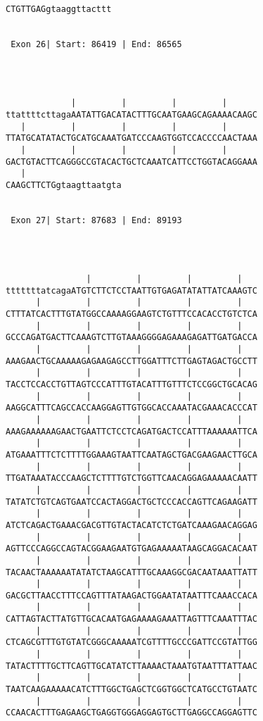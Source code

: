 \documentclass{article}
\begin{document}
\begin{Verbatim}
CTGTTGAGgtaaggttacttt


 Exon 26| Start: 86419 | End: 86565 




             |         |         |         |      
ttattttcttagaAATATTGACATACTTTGCAATGAAGCAGAAAACAAGC
   |         |         |         |         |      
TTATGCATATACTGCATGCAAATGATCCCAAGTGGTCCACCCCAACTAAA
   |         |         |         |         |      
GACTGTACTTCAGGGCCGTACACTGCTCAAATCATTCCTGGTACAGGAAA
   |      
CAAGCTTCTGgtaagttaatgta


 Exon 27| Start: 87683 | End: 89193 




                |         |         |         |   
tttttttatcagaATGTCTTCTCCTAATTGTGAGATATATTATCAAAGTC
      |         |         |         |         |   
CTTTATCACTTTGTATGGCCAAAAGGAAGTCTGTTTCCACACCTGTCTCA
      |         |         |         |         |   
GCCCAGATGACTTCAAAGTCTTGTAAAGGGGAGAAAGAGATTGATGACCA
      |         |         |         |         |   
AAAGAACTGCAAAAAGAGAAGAGCCTTGGATTTCTTGAGTAGACTGCCTT
      |         |         |         |         |   
TACCTCCACCTGTTAGTCCCATTTGTACATTTGTTTCTCCGGCTGCACAG
      |         |         |         |         |   
AAGGCATTTCAGCCACCAAGGAGTTGTGGCACCAAATACGAAACACCCAT
      |         |         |         |         |   
AAAGAAAAAAGAACTGAATTCTCCTCAGATGACTCCATTTAAAAAATTCA
      |         |         |         |         |   
ATGAAATTTCTCTTTTGGAAAGTAATTCAATAGCTGACGAAGAACTTGCA
      |         |         |         |         |   
TTGATAAATACCCAAGCTCTTTTGTCTGGTTCAACAGGAGAAAAACAATT
      |         |         |         |         |   
TATATCTGTCAGTGAATCCACTAGGACTGCTCCCACCAGTTCAGAAGATT
      |         |         |         |         |   
ATCTCAGACTGAAACGACGTTGTACTACATCTCTGATCAAAGAACAGGAG
      |         |         |         |         |   
AGTTCCCAGGCCAGTACGGAAGAATGTGAGAAAAATAAGCAGGACACAAT
      |         |         |         |         |   
TACAACTAAAAAATATATCTAAGCATTTGCAAAGGCGACAATAAATTATT
      |         |         |         |         |   
GACGCTTAACCTTTCCAGTTTATAAGACTGGAATATAATTTCAAACCACA
      |         |         |         |         |   
CATTAGTACTTATGTTGCACAATGAGAAAAGAAATTAGTTTCAAATTTAC
      |         |         |         |         |   
CTCAGCGTTTGTGTATCGGGCAAAAATCGTTTTGCCCGATTCCGTATTGG
      |         |         |         |         |   
TATACTTTTGCTTCAGTTGCATATCTTAAAACTAAATGTAATTTATTAAC
      |         |         |         |         |   
TAATCAAGAAAAACATCTTTGGCTGAGCTCGGTGGCTCATGCCTGTAATC
      |         |         |         |         |   
CCAACACTTTGAGAAGCTGAGGTGGGAGGAGTGCTTGAGGCCAGGAGTTC

\end{Verbatim}
\end{document}
